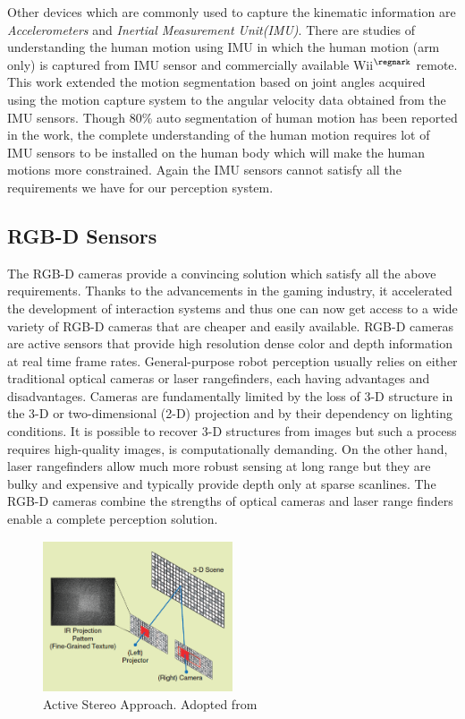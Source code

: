 	Other devices which are commonly used to capture the kinematic information are \emph{Accelerometers} and \emph{Inertial Measurement Unit(IMU)}. There are studies of understanding the human motion using IMU\cite{aoki2013segmentation} in which the human motion (arm only) is captured from IMU sensor and commercially available Wii$^{\regmark}$ remote. This work extended the motion segmentation based on joint angles acquired using the motion capture system to the angular velocity data obtained from the IMU sensors. Though 80\% auto segmentation of human motion has been reported in the work, the complete understanding of the human motion requires lot of IMU sensors to be installed on the human body which will make the human motions more constrained. Again the IMU sensors cannot satisfy all the requirements we have for our perception system.
\subsection{RGB-D Sensors}
\label{ssec:rgbd_sensors}
	The RGB-D cameras provide a convincing solution which satisfy all the above requirements. Thanks to the advancements in the gaming industry, it accelerated the development of interaction systems and thus one can now get access to a wide variety of RGB-D cameras that are cheaper and easily available. RGB-D cameras\cite{ren2013change} are active sensors that provide high resolution dense color and depth information at real time frame rates. General-purpose robot perception usually relies on either traditional optical cameras or laser rangefinders, each having advantages and disadvantages. Cameras are fundamentally limited by the loss of 3-D structure in the 3-D or two-dimensional (2-D) projection and by their dependency on lighting conditions. It is possible to recover 3-D structures from images but such a process requires high-quality images, is computationally demanding. On the other hand, laser rangefinders allow much more robust sensing at long range but they are bulky and expensive and typically provide depth only at sparse scanlines. The RGB-D cameras combine the strengths of optical cameras and laser range finders enable a complete perception solution.
\begin{figure}
\centering
\includegraphics[width=0.5\textwidth]{assets/rgbd_activestereo.png}
\caption[Active Stereo Approach]{Active Stereo Approach. {Adopted from \cite{ren2013change}}}
\label{fig:rgbd_activestereo}
\end{figure}

